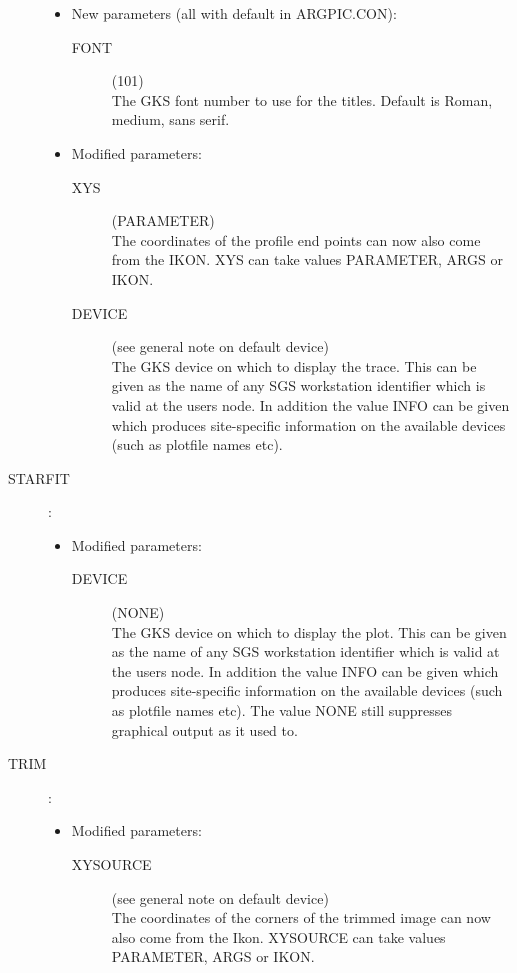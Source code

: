 \begin{description}
\begin{itemize}
\item New parameters (all with default in ARGPIC.CON):
\begin{description}
\item [FONT](101)\\
 The GKS font number to use for the titles.
 Default is Roman, medium, sans serif.
\end{description}
\item Modified parameters:
\begin{description}
\item [XYS](PARAMETER)\\
 The coordinates of the profile end points can now also come from the IKON.
 XYS can take values PARAMETER, ARGS or IKON.
\item [DEVICE](see general note on default device)\\
 The GKS device on which to display the trace.
 This can be given as the name of any SGS workstation identifier which is valid
 at the users node.
 In addition the value INFO can be given which produces site-specific
 information on the available devices (such as plotfile names etc). 
\end{description}
\end{itemize}

\item [STARFIT]:

\begin{itemize}
\item Modified parameters:
\begin{description}
\item [DEVICE](NONE)\\
 The GKS device on which to display the plot.
 This can be given as the name of any SGS workstation identifier which is valid
 at the users node.
 In addition the value INFO can be given which produces site-specific
 information on the available devices (such as plotfile names etc).
 The value NONE still suppresses graphical output as it used to.
\end{description}
\end{itemize}

\item [TRIM]:

\begin{itemize}
\item Modified parameters:
\begin{description}
\item [XYSOURCE](see general note on default device)\\
 The coordinates of the corners of the trimmed image can now also come from the
 Ikon.
 XYSOURCE can take values PARAMETER, ARGS or IKON.
\end{description}
\end{itemize}


\end{description}
